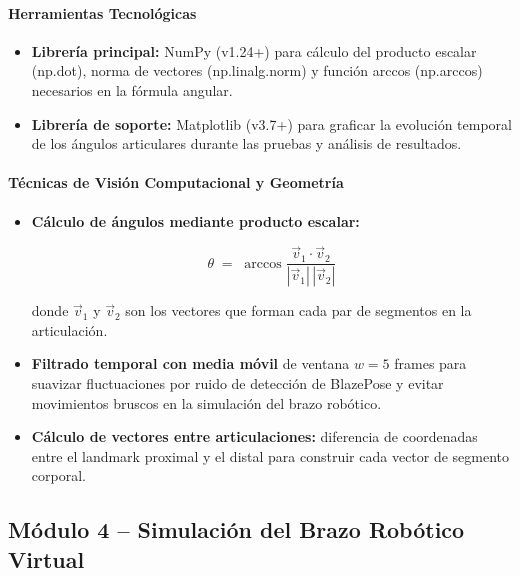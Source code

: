 \paragraph{Herramientas Tecnológicas}\mbox{}

\begin{itemize}[leftmargin=1.5em]
  \item \textbf{Librería principal:} NumPy (v1.24+) para
        cálculo del producto escalar (np.dot), norma de
        vectores (np.linalg.norm) y función
        arccos (np.arccos) necesarios en la fórmula
        angular.
  \item \textbf{Librería de soporte:} Matplotlib (v3.7+)
        para graficar la evolución temporal de los ángulos articulares
        durante las pruebas y análisis de resultados.
\end{itemize}
 
\paragraph{Técnicas de Visión Computacional y Geometría}
\begin{itemize}[leftmargin=1.5em]
  \item \textbf{Cálculo de ángulos mediante producto escalar:}
        \cite{GonzalezWoods2018}
 
        \begin{equation}
            \theta \;=\; \arccos{ \frac{\vec{v}_1 \cdot \vec{v}_2}{|\vec{v}_1|\,|\vec{v}_2|} }
            \label{eq:angulo}
        \end{equation}

        donde $\vec{v}_1$ y $\vec{v}_2$ son los vectores que forman
        cada par de segmentos en la articulación.

  \item \textbf{Filtrado temporal con media móvil} de ventana $w = 5$
        frames para suavizar fluctuaciones por ruido de detección de
        BlazePose y evitar movimientos bruscos en la simulación del
        brazo robótico.
  \item \textbf{Cálculo de vectores entre articulaciones:} diferencia
        de coordenadas entre el landmark proximal y el distal para
        construir cada vector de segmento corporal.
\end{itemize}
 

\subsection{Módulo 4 -- Simulación del Brazo Robótico Virtual}

